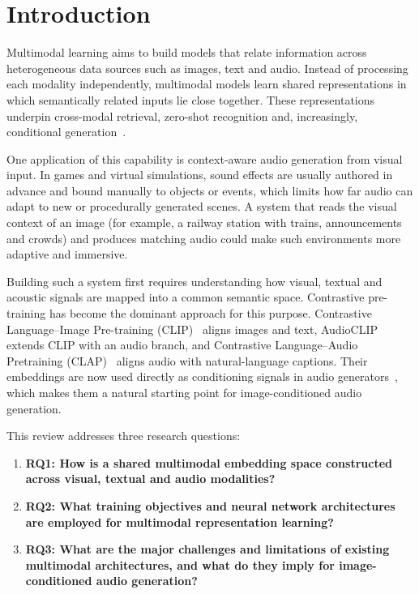 \section{Introduction}\label{sec1}

Multimodal learning aims to build models that relate information across heterogeneous data sources such as images, text and audio. Instead of processing each modality independently, multimodal models learn shared representations in which semantically related inputs lie close together. These representations underpin cross-modal retrieval, zero-shot recognition and, increasingly, conditional generation~\cite{radford2021clip,girdhar2023imagebind}.

One application of this capability is context-aware audio generation from visual input. In games and virtual simulations, sound effects are usually authored in advance and bound manually to objects or events, which limits how far audio can adapt to new or procedurally generated scenes. A system that reads the visual context of an image (for example, a railway station with trains, announcements and crowds) and produces matching audio could make such environments more adaptive and immersive.

Building such a system first requires understanding how visual, textual and acoustic signals are mapped into a common semantic space. Contrastive pre-training has become the dominant approach for this purpose. Contrastive Language--Image Pre-training (CLIP)~\cite{radford2021clip} aligns images and text, AudioCLIP~\cite{guzhov2022audioclip} extends CLIP with an audio branch, and Contrastive Language--Audio Pretraining (CLAP)~\cite{elizalde2023clap} aligns audio with natural-language captions. Their embeddings are now used directly as conditioning signals in audio generators~\cite{liu2023audioldm,sheffer2023im2wav,wang2024v2amapper}, which makes them a natural starting point for image-conditioned audio generation.

This review addresses three research questions:

\begin{enumerate}
    \item \textbf{RQ1: How is a shared multimodal embedding space constructed across visual, textual and audio modalities?}
    \item \textbf{RQ2: What training objectives and neural network architectures are employed for multimodal representation learning?}
    \item \textbf{RQ3: What are the major challenges and limitations of existing multimodal architectures, and what do they imply for image-conditioned audio generation?}
\end{enumerate}

